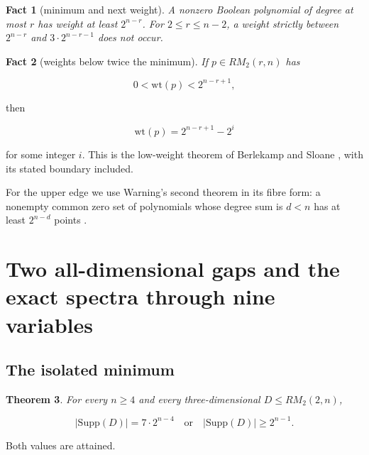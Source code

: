 \documentclass[11pt]{article}
\newtheorem{theorem}{Theorem}[section]
\newtheorem{fact}[theorem]{Fact}
\theoremstyle{remark}
\numberwithin{equation}{section}
\begin{document}
\Needspace{0.23\textheight}
\begin{fact}[minimum and next weight]
A nonzero Boolean polynomial of degree at
most \(r\) has weight at least \(2^{n-r}\). For \(2\le r\le n-2\), a weight
strictly between \(2^{n-r}\) and \(3\cdot2^{n-r-1}\) does not occur.
\end{fact}


\Needspace{0.23\textheight}
\begin{fact}[weights below twice the minimum]
If
\(p\in RM_2(r,n)\) has
\end{fact}


\[
0<\mathrm{wt}(p)<2^{n-r+1},
\]

then

\[
\mathrm{wt}(p)=2^{n-r+1}-2^i
\]

for some integer \(i\). This is the low-weight theorem of Berlekamp and Sloane
\cite{berlekamp1969}, with its stated boundary included.

For the upper edge we use Warning's second theorem in its fibre form: a nonempty
common zero set of polynomials whose degree sum is \(d<n\) has at least
\(2^{n-d}\) points \cite{asgarli2018}.

\section{Two all-dimensional gaps and the exact spectra through nine variables}


\subsection{The isolated minimum}


\Needspace{0.23\textheight}
\begin{theorem}
For every \(n\ge4\) and every three-dimensional
\(D\le RM_2(2,n)\),
\end{theorem}


\[
|\mathrm{Supp}(D)|=7\cdot2^{n-4}
\quad\text{or}\quad
|\mathrm{Supp}(D)|\ge2^{n-1}.                  \tag{3.1}
\]

Both values are attained.
\end{document}
